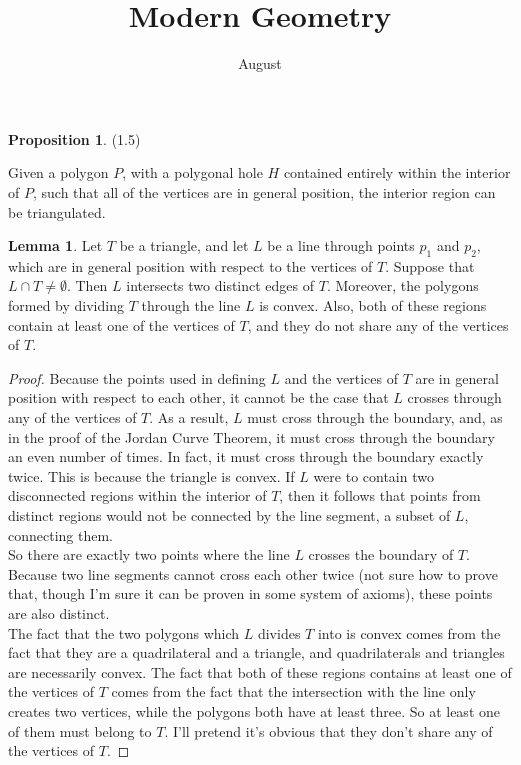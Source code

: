 \documentclass[12pt]{article}
\title{Modern Geometry}
\author{August}
\theoremstyle{definition}
\newtheorem{lemma}{Lemma}
\newtheorem{proposition}{Proposition}
\begin{document}
\maketitle

\begin{proposition}(1.5)

Given a polygon $P$, with a polygonal hole $H$ contained entirely within the interior of $P$, such that all of the vertices are in general position, the interior region can be triangulated. 
\end{proposition}

\begin{lemma}
Let $T$ be a triangle, and let $L$ be a line through points $p_1$ and $p_2$, which are in general position with respect to the vertices of $T$. Suppose that $L \cap T \ne \emptyset$. Then $L$ intersects two distinct edges of $T$. Moreover, the polygons formed by dividing $T$ through the line $L$ is convex. Also, both of these regions contain at least one of the vertices of $T$, and they do not share any of the vertices of $T$.
\end{lemma}

\begin{proof}
Because the points used in defining $L$ and the vertices of $T$ are in general position with respect to each other, it cannot be the case that $L$ crosses through any of the vertices of $T$. As a result, $L$ must cross through the boundary, and, as in the proof of the Jordan Curve Theorem, it must cross through the boundary an even number of times. In fact, it must cross through the boundary exactly twice. This is because the triangle is convex. If $L$ were to contain two disconnected regions within the interior of $T$, then it follows that points from distinct regions would not be connected by the line segment, a subset of $L$, connecting them. \\

So there are exactly two points where the line $L$ crosses the boundary of $T$. Because two line segments cannot cross each other twice (not sure how to prove that, though I'm sure it can be proven in some system of axioms), these points are also distinct.\\

The fact that the two polygons which $L$ divides $T$ into is convex comes from the fact that they are a quadrilateral and a triangle, and quadrilaterals and triangles are necessarily convex. The fact that both of these regions contains at least one of the vertices of $T$ comes from the fact that the intersection with the line only creates two vertices, while the polygons both have at least three. So at least one of them must belong to $T$. I'll pretend it's obvious that they don't share any of the vertices of $T$.
\end{proof}
\end{document}
